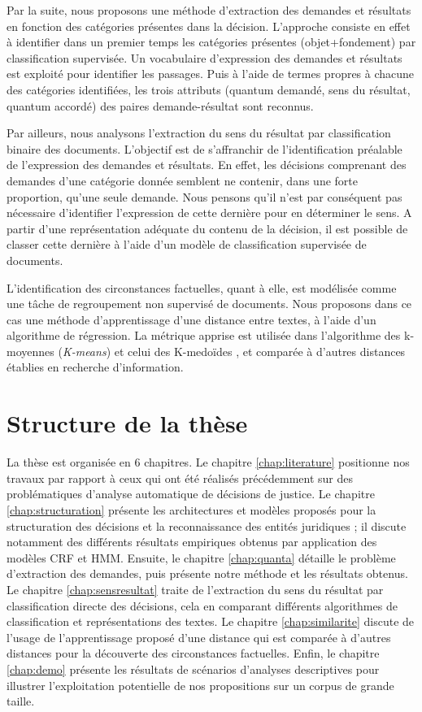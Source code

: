Par la suite, nous proposons une méthode d'extraction des demandes et résultats en fonction des catégories présentes dans la décision. L'approche consiste en effet à identifier dans un premier temps les catégories présentes (objet+fondement) par classification supervisée. Un vocabulaire d'expression des demandes et résultats est exploité pour identifier les passages. Puis à l'aide de termes propres à chacune des catégories identifiées, les trois attributs (quantum demandé, sens du résultat, quantum accordé) des paires demande-résultat sont reconnus. 

Par ailleurs, nous analysons l'extraction du sens du résultat par classification binaire des documents. L'objectif est de s'affranchir de l'identification préalable de l'expression des demandes et résultats. En effet, les décisions comprenant des demandes d'une catégorie donnée semblent ne contenir, dans une forte proportion, qu'une seule demande. Nous pensons qu'il n'est par conséquent pas nécessaire d'identifier l'expression de cette dernière pour en déterminer le sens. A partir d'une représentation adéquate du contenu de la décision, il est possible de classer cette dernière à l'aide d'un modèle de classification supervisée de documents.

L'identification des circonstances factuelles, quant à elle, est modélisée comme une tâche de regroupement non supervisé de documents. Nous proposons dans ce cas une méthode d'apprentissage d'une distance entre textes, à l'aide d'un algorithme de régression. La métrique apprise est utilisée dans l'algorithme des k-moyennes (\textit{K-means}) \citep{forgey1965kmeans} et celui des K-medoïdes \citep{kaufman1987kmedoids}, et comparée à d'autres distances établies en recherche d'information.

\section{Structure de la thèse}
\label{sec:intro:organisation}

La thèse est organisée en 6 chapitres. Le chapitre \ref{chap:literature} positionne nos travaux par rapport à ceux qui ont été réalisés précédemment sur des problématiques d'analyse automatique de décisions de justice. Le chapitre \ref{chap:structuration} présente les architectures et modèles proposés pour la structuration des décisions et la reconnaissance des entités juridiques ; il discute notamment des différents résultats empiriques obtenus par application des modèles CRF et HMM. Ensuite, le chapitre \ref{chap:quanta} détaille le problème  d'extraction des demandes, puis présente notre méthode et les résultats obtenus. Le chapitre \ref{chap:sensresultat} traite de l'extraction du sens du résultat par classification directe des décisions, cela en comparant différents algorithmes de classification et représentations des textes. Le chapitre \ref{chap:similarite} discute de l'usage de l'apprentissage proposé d'une distance qui est comparée à d'autres distances pour la découverte des circonstances factuelles. Enfin, le chapitre \ref{chap:demo} présente les résultats de scénarios d'analyses descriptives pour illustrer l'exploitation potentielle de nos propositions sur un corpus de grande taille. 

